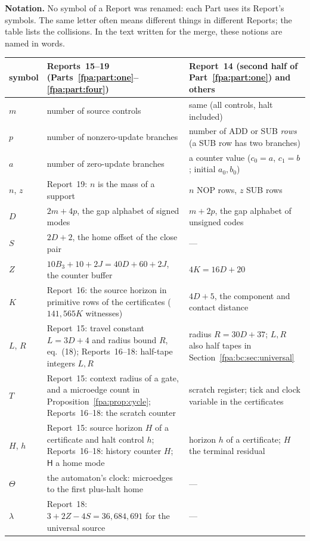 \documentclass[11pt,a4paper]{article}
\numberwithin{equation}{section}
\begin{document}
\textbf{Notation.} No symbol of a Report was renamed: each Part uses its Report's symbols. The same letter often means different things in different Reports; the table lists the collisions. In the text written for the merge, these notions are named in words.
\begin{center}
\small
\begin{longtable}{@{}p{}p{}p{}@{}}
\toprule
symbol & Reports~15--19 (Parts~\ref{fpa:part:one}--\ref{fpa:part:four}) & Report~14 (second half of Part~\ref{fpa:part:one}) and others\\
\midrule
\endhead
$m$ & number of source controls & same (all controls, halt included)\\
$p$ & number of nonzero-update branches & number of ADD or SUB \emph{rows} (a SUB row has two branches)\\
$a$ & number of zero-update branches & a counter value ($c_0=a$, $c_1=b$; initial $a_0,b_0$)\\
$n$, $z$ & Report~19: $n$ is the mass of a support & $n$ NOP rows, $z$ SUB rows\\
$D$ & $2m+4p$, the gap alphabet of signed modes & $m+2p$, the gap alphabet of unsigned codes\\
$S$ & $2D+2$, the home offset of the close pair & ---\\
$Z$ & $10B_3+10+2J=40D+60+2J$, the counter buffer & $4K=16D+20$\\
$K$ & Report~16: the source horizon in primitive rows of the certificates ($141{,}565K$ witnesses) & $4D+5$, the component and contact distance\\
$L$, $R$ & Report~15: travel constant $L=3D+4$ and radius bound $R$, eq.~(18); Reports~16--18: half-tape integers $L,R$ & radius $R=30D+37$; $L,R$ also half tapes in Section~\ref{fpa:bc:sec:universal}\\
$T$ & Report~15: context radius of a gate, and a microedge count in Proposition~\ref{fpa:prop:cycle}; Reports~16--18: the scratch counter & scratch register; tick and clock variable in the certificates\\
$H$, $h$ & Report~15: source horizon $H$ of a certificate and halt control $h$; Reports~16--18: history counter $H$; $\mathsf H$ a home mode & horizon $h$ of a certificate; $H$ the terminal residual\\
$\Theta$ & the automaton's clock: microedges to the first plus-halt home & ---\\
$\lambda$ & Report~18: $3+2Z-4S=36{,}684{,}691$ for the universal source & ---\\

\end{longtable}
\end{center}
\end{document}
